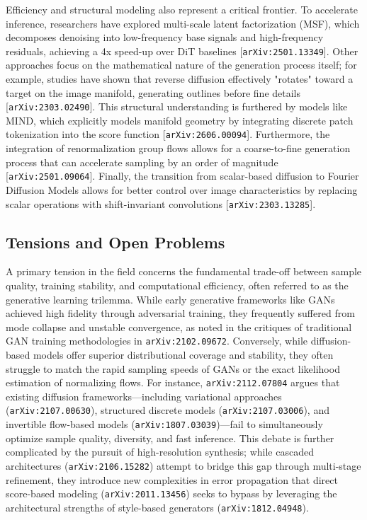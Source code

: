 \documentclass[11pt]{article}
\begin{document}
Efficiency and structural modeling also represent a critical frontier. To accelerate inference, researchers have explored multi-scale latent factorization (MSF), which decomposes denoising into low-frequency base signals and high-frequency residuals, achieving a 4x speed-up over DiT baselines [\texttt{arXiv:2501.13349}]. Other approaches focus on the mathematical nature of the generation process itself; for example, studies have shown that reverse diffusion effectively "rotates" toward a target on the image manifold, generating outlines before fine details [\texttt{arXiv:2303.02490}]. This structural understanding is furthered by models like MIND, which explicitly models manifold geometry by integrating discrete patch tokenization into the score function [\texttt{arXiv:2606.00094}]. Furthermore, the integration of renormalization group flows allows for a coarse-to-fine generation process that can accelerate sampling by an order of magnitude [\texttt{arXiv:2501.09064}]. Finally, the transition from scalar-based diffusion to Fourier Diffusion Models allows for better control over image characteristics by replacing scalar operations with shift-invariant convolutions [\texttt{arXiv:2303.13285}].

\subsection{Tensions and Open Problems}

A primary tension in the field concerns the fundamental trade-off between sample quality, training stability, and computational efficiency, often referred to as the generative learning trilemma. While early generative frameworks like GANs achieved high fidelity through adversarial training, they frequently suffered from mode collapse and unstable convergence, as noted in the critiques of traditional GAN training methodologies in \texttt{arXiv:2102.09672}. Conversely, while diffusion-based models offer superior distributional coverage and stability, they often struggle to match the rapid sampling speeds of GANs or the exact likelihood estimation of normalizing flows. For instance, \texttt{arXiv:2112.07804} argues that existing diffusion frameworks—including variational approaches (\texttt{arXiv:2107.00630}), structured discrete models (\texttt{arXiv:2107.03006}), and invertible flow-based models (\texttt{arXiv:1807.03039})—fail to simultaneously optimize sample quality, diversity, and fast inference. This debate is further complicated by the pursuit of high-resolution synthesis; while cascaded architectures (\texttt{arXiv:2106.15282}) attempt to bridge this gap through multi-stage refinement, they introduce new complexities in error propagation that direct score-based modeling (\texttt{arXiv:2011.13456}) seeks to bypass by leveraging the architectural strengths of style-based generators (\texttt{arXiv:1812.04948}).
\end{document}
